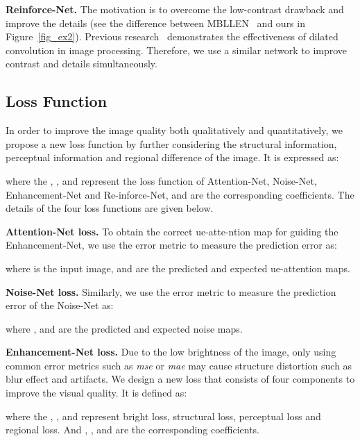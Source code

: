 {\bf Reinforce-Net.} The motivation is to overcome the low-contrast drawback and improve the details (see the difference between MBLLEN~\cite{lvmbllen} and ours in Figure~\ref{fig_ex2}). Previous research~\cite{Qifeng2017Fast} demonstrates the effectiveness of dilated convolution in image processing. Therefore, we use a similar network to improve contrast and details simultaneously.

\subsection{Loss Function}
In order to improve the image quality both qualitatively and quantitatively, we propose a new loss function by further considering the structural information, perceptual information and regional difference of the image. It is expressed as:
\begin{shrinkeq}{0.5ex}{
		
}\end{shrinkeq}
where the , ,  and  represent the loss function of Attention-Net, Noise-Net, Enhancement-Net and Re-inforce-Net, and  are the corresponding coefficients. The details of the four loss functions are given below.

{\bf Attention-Net loss.} To obtain the correct ue-atte-ntion map for guiding the Enhancement-Net, we use the  error metric to measure the prediction error as:
\begin{shrinkeq}{0.5ex}{
		
}\end{shrinkeq}
where  is the input image,  and  are the predicted and expected ue-attention maps.

{\bf Noise-Net loss.} Similarly, we use the  error metric to measure the prediction error of the Noise-Net as:
\begin{shrinkeq}{0.5ex}{

}\end{shrinkeq}
where ,  and  are the predicted and expected noise maps.

{\bf Enhancement-Net loss.} Due to the low brightness of the image, only using common error metrics such as \textit{mse} or \textit{mae} may cause structure distortion such as blur effect and artifacts. We design a new loss that consists of four components to improve the visual quality. It is defined as:
\begin{shrinkeq}{0.5ex}{
		
}\end{shrinkeq}
where the , ,  and  represent bright loss, structural loss, perceptual loss and regional loss. And , ,  and  are the corresponding coefficients.

